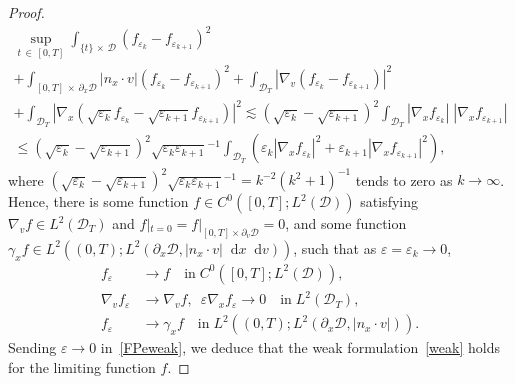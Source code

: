 \documentclass[AHL,Unicode,longabstracts,published]{cedram}
\newcommand*{\dif}{\mathop{}\!\mathrm{d}}
\newcommand*\p{\partial}
\newcommand*\D {\mathcal{D}}
\begin{document}
\begin{proof}
\begin{multline*}
\sup_{t\,\in\,[0,T]} \int_{\{t\}\,\times\,\D} \left(f_{\varepsilon_{k}}-f_{\varepsilon_{k+1}}\right)^2 \\
+ \int_{[0,T]\,\times\,\p_x\D} |n_x\cdot v| \left(f_{\varepsilon_{k}}-f_{\varepsilon_{k+1}}\right)^2 + \int_{\D_T}\left|\nabla_v\left(f_{\varepsilon_{k}}-f_{\varepsilon_{k+1}}\right)\right|^2 \\
+ \int_{\D_T}\left|\nabla_x\left(\sqrt{\varepsilon_{k}}f_{\varepsilon_{k}}-\sqrt{\varepsilon_{k+1}}f_{\varepsilon_{k+1}}\right)\right|^2
\lesssim \left(\sqrt{\varepsilon_{k}}-\sqrt{\varepsilon_{k+1}}\right)^2
\int_{\D_T}|\nabla_xf_{\varepsilon_{k}}|\;\left|\nabla_xf_{\varepsilon_{k+1}}\right|\\
\le \left(\sqrt{\varepsilon_{k}}-\sqrt{\varepsilon_{k+1}}\right)^2\sqrt{\varepsilon_{k}\varepsilon_{k+1}}^{-1}
\int_{\D_T}\left(\varepsilon_{k}\left|\nabla_xf_{\varepsilon_{k}}\right|^2+\varepsilon_{k+1}\left|\nabla_xf_{\varepsilon_{k+1}}\right|^2\right),
\end{multline*}
where $(\sqrt{\varepsilon_{k}}-\sqrt{\varepsilon_{k+1}})^2\sqrt{\varepsilon_{k}\varepsilon_{k+1}}^{-1}=k^{-2}(k^2+1)^{-1}$ tends to zero as $k\rightarrow\infty$. Hence, there is some function $f\in C^0([0,T];L^2(\D))$ satisfying $\nabla_vf\in L^2\left(\D_T\right)$ and $f|_{t=0}=f|_{[0,T]\times\p_v\D}=0$, and some function $\gamma_xf\in L^2((0,T);L^2(\p_x\D,|n_x\cdot v|\dif x\dif v))$, such that as $\varepsilon=\varepsilon_k\rightarrow0$,
\begin{equation}\label{felimit}
\begin{split}
f_\varepsilon &\rightarrow f \quad\text{in}\; C^0\left([0,T];L^2(\D)\right),\\
\nabla_vf_\varepsilon &\rightarrow \nabla_vf, \ \; \varepsilon\nabla_xf_\varepsilon\rightarrow 0 \quad\text{in}\; L^2(\D_T),  \\
f_\varepsilon &\rightarrow \gamma_xf\quad\text{in}\; L^2\left((0,T);L^2\left(\p_x\D,|n_x\cdot v|\right)\right).
\end{split}
\end{equation}
Sending $\varepsilon\rightarrow0$ in~\eqref{FPeweak}, we deduce that the weak formulation~\eqref{weak} holds for the limiting function $f$.


\end{proof}
\end{document}
